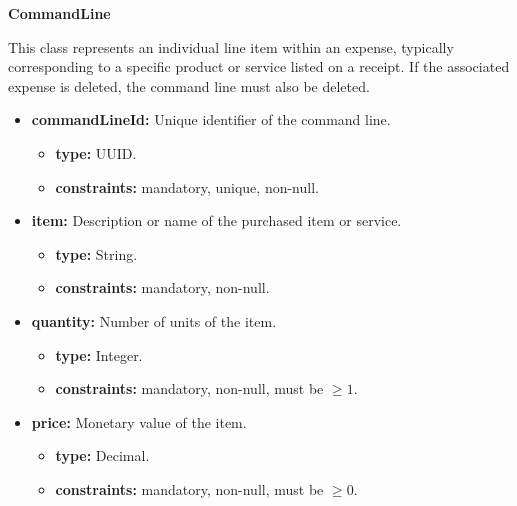\textbf{CommandLine}

This class represents an individual line item within an expense, typically corresponding to a specific product or service listed on a receipt. If the associated expense is deleted, the command line must also be deleted.

\begin{itemize} [leftmargin=0.75cm, noitemsep, label=\textbullet]

    \item \textbf{commandLineId:} Unique identifier of the command line.
    
    \begin{itemize} [leftmargin=0.75cm, noitemsep, label=$\circ$]

        \item \textbf{type:} UUID.

        \item \textbf{constraints:} mandatory, unique, non-null.

    \end{itemize}

    \item \textbf{item:} Description or name of the purchased item or service.
    
    \begin{itemize} [leftmargin=0.75cm, noitemsep, label=$\circ$]

        \item \textbf{type:} String.

        \item \textbf{constraints:} mandatory, non-null.

    \end{itemize}

    \newpage

    \item \textbf{quantity:} Number of units of the item.
    
    \begin{itemize} [leftmargin=0.75cm, noitemsep, label=$\circ$]

        \item \textbf{type:} Integer.

        \item \textbf{constraints:} mandatory, non-null, must be $\geq 1$.

    \end{itemize}

    \item \textbf{price:} Monetary value of the item.
    
    \begin{itemize} [leftmargin=0.75cm, noitemsep, label=$\circ$]

        \item \textbf{type:} Decimal.

        \item \textbf{constraints:} mandatory, non-null, must be $\geq 0$.

    \end{itemize}

\end{itemize}